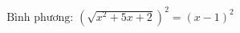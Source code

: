 \documentclass[preview]{standalone}
\begin{document}
\begin{align*}
\text{Bình phương: } \left(\sqrt{x^2 + 5x + 2}\right)^2 = (x - 1)^2
\end{align*}
\end{document}
